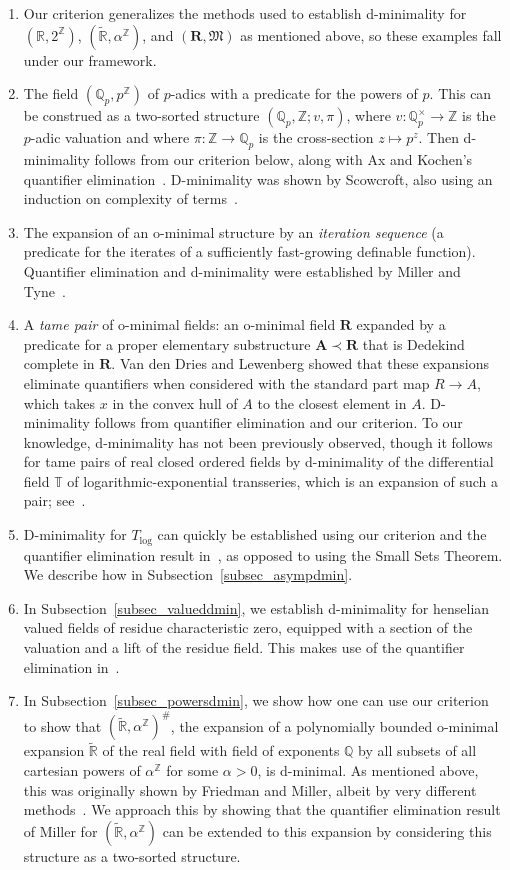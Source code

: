 \documentclass[11pt]{amsart}
\theoremstyle{plain}
\theoremstyle{definition}
\numberwithin{equation}{section}
\newcommand\Q{\mathbb{Q}}
\newcommand\R{\mathbb{R}}
\newcommand\Z{\mathbb{Z}}
\newcommand\0{\varnothing}
\begin{document}
\begin{enumerate}
\item Our criterion generalizes the methods used to establish d-minimality for $(\R,2^\Z)$, $(\tilde{\R},\alpha^\Z)$, and $(\bm{R},\mathfrak{M})$ as mentioned above, so these examples fall under our framework.
\item The field $(\Q_p,p^\Z)$ of $p$-adics with a predicate for the powers of $p$. This can be construed as a two-sorted structure $(\Q_p,\Z; v,\pi)$, where $v\colon \Q_p^\times \to \Z$ is the $p$-adic valuation and where $\pi\colon \Z\to \Q_p$ is the cross-section $z\mapsto p^z$. Then d-minimality follows from our criterion below, along with Ax and Kochen's quantifier elimination~\cite{AK66}. D-minimality was shown by Scowcroft, also using an induction on complexity of terms~\cite{scowcroft-moredefpadic}.
\item The expansion of an o-minimal structure by an \emph{iteration sequence} (a predicate for the iterates of a sufficiently fast-growing definable function). Quantifier elimination and d-minimality were established by Miller and Tyne~\cite{MT06}. 
\item A \emph{tame pair} of o-minimal fields: an o-minimal field $\bm{R}$ expanded by a predicate for a proper elementary substructure $\bm{A} \prec \bm{R}$ that is Dedekind complete in $\bm{R}$. Van den Dries and Lewenberg showed that these expansions eliminate quantifiers when considered with the standard part map $R\to A$, which takes $x$ in the convex hull of $A$ to the closest element in $A$. D-minimality follows from quantifier elimination and our criterion. To our knowledge, d-minimality has not been previously observed, though it follows for tame pairs of real closed ordered fields by d-minimality of the differential field $\mathbb{T}$ of logarithmic-exponential transseries, which is an expansion of such a pair; see~\cite[Corollary~16.6.11]{ADAMTT}. \item D-minimality for $T_{\log}$ can quickly be established using our criterion and the quantifier elimination result in~\cite{GehretACTlog}, as opposed to using the Small Sets Theorem. We describe how in Subsection~\ref{subsec_asympdmin}.
\item In Subsection~\ref{subsec_valueddmin}, we establish d-minimality for henselian valued fields of residue characteristic zero, equipped with a section of the valuation and a lift of the residue field. This makes use of the quantifier elimination in~\cite{vdD14}.
\item In Subsection~\ref{subsec_powersdmin}, we show how one can use our criterion to show that $(\tilde{\R},\alpha^\Z)^{\#}$, the expansion of a polynomially bounded o-minimal expansion $\tilde{\R}$ of the real field with field of exponents $\Q$ by all subsets of all cartesian powers of $\alpha^\Z$ for some $\alpha>0$, is d-minimal. As mentioned above, this was originally shown by Friedman and Miller, albeit by very different methods~\cite{FM01}. We approach this by showing that the quantifier elimination result of Miller for $(\tilde{\R},\alpha^\Z)$ can be extended to this expansion by considering this structure as a two-sorted structure.
\end{enumerate}
\end{document}
